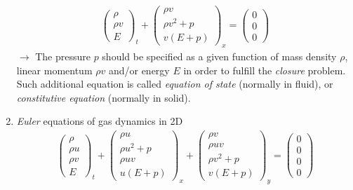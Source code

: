 \documentclass[12pt]{article}
\begin{document}
\begin{enumerate}
	      \begin{align}
		      \begin{pmatrix} \rho\\\rho v \\ E \end{pmatrix}_{t}
		      +
		      \begin{pmatrix} \rho v\\\rho v^2 + p \\ v(E+p) \end{pmatrix}_{x}
		      =
		      \begin{pmatrix} 0\\ 0 \\ 0 \end{pmatrix}
	      \end{align}
	      $\rightarrow$ The pressure $p$ should be specified as a given function of 
	      mass density $\rho$, linear momentum $\rho v$ and/or energy $E$ in order to 
	      fulfill the \emph{closure} problem.
	      Such additional equation is called \emph{equation of state} (normally in fluid), or 
	      \emph{constitutive equation} (normally in solid). 
	\item \emph{Euler} equations of gas dynamics in 2D
	      \begin{align}
		      \begin{pmatrix} \rho\\ \rho u\\ \rho v \\ E \end{pmatrix}_{t}
		      +
		      \begin{pmatrix} \rho u\\ \rho u^2 + p \\ \rho uv \\ u(E+p) \end{pmatrix}_{x}
		      + 
		      \begin{pmatrix} \rho v\\ \rho uv \\ \rho v^2 + p \\ v(E+p) \end{pmatrix}_{y}
		      =
		      \begin{pmatrix} 0 \\ 0 \\ 0 \\ 0 \end{pmatrix}
	      \end{align}
\end{enumerate}
\end{document}

